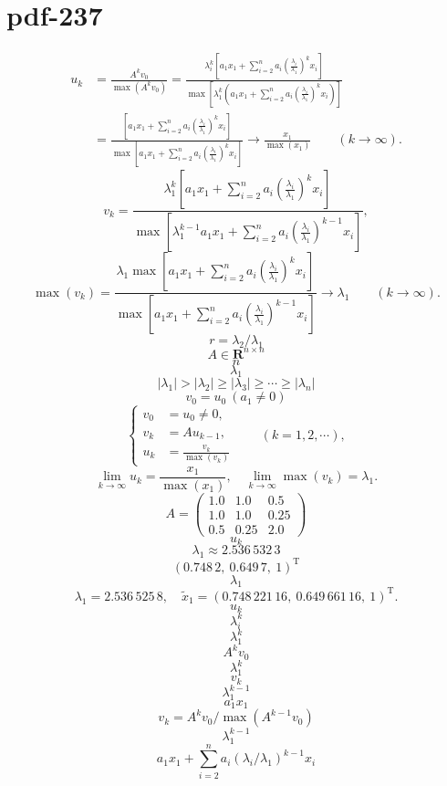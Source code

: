 \documentclass[fontset=fandol]{ctexart}
\begin{document}
\section*{pdf-237}
\[
\begin{aligned}
u_k&=\frac{A^kv_0}{\max(A^kv_0)}
=\frac{\lambda_i^k\left[a_1x_1+\displaystyle\sum_{i=2}^na_i\left(\frac{\lambda_i}{\lambda_1}\right)^kx_i\right]}{\max\left[\lambda_1^k\left(a_1x_1+\displaystyle\sum_{i=2}^na_i\left(\frac{\lambda_i}{\lambda_1}\right)^kx_i\right)\right]}\\
&=\frac{\left[a_1x_1+\displaystyle\sum_{i=2}^na_i\left(\frac{\lambda_i}{\lambda_1}\right)^kx_i\right]}{\max\left[a_1x_1+\displaystyle\sum_{i=2}^na_i\left(\frac{\lambda_i}{\lambda_1}\right)^kx_i\right]}
\to\frac{x_1}{\max(x_1)}\qquad(k\to\infty).
\end{aligned}
\]
\[
v_k=\frac{\lambda_1^k\left[a_1x_1+\displaystyle\sum_{i=2}^na_i\left(\frac{\lambda_i}{\lambda_1}\right)^kx_i\right]}{\max\left[\lambda_1^{k-1}a_1x_1+\displaystyle\sum_{i=2}^na_i\left(\frac{\lambda_i}{\lambda_1}\right)^{k-1}x_i\right]},
\]
\[
\max(v_k)=\frac{\lambda_1\max\left[a_1x_1+\displaystyle\sum_{i=2}^na_i\left(\frac{\lambda_i}{\lambda_1}\right)^kx_i\right]}{\max\left[a_1x_1+\displaystyle\sum_{i=2}^na_i\left(\frac{\lambda_i}{\lambda_1}\right)^{k-1}x_i\right]}\to\lambda_1\qquad(k\to\infty).
\]
\[
r=\lambda_2/\lambda_1
\]
\[
A\in\mathbf R^{n\times n}
\]
\[
n
\]
\[
\lambda_1
\]
\[
|\lambda_1|>|\lambda_2|\geq|\lambda_3|\geq\cdots\geq|\lambda_n|
\]
\[
v_0=u_0\ (a_1\ne0)
\]
\[
\left\{
\begin{aligned}
v_0&=u_0\ne0,\\
v_k&=Au_{k-1},\\
u_k&=\frac{v_k}{\max(v_k)}
\end{aligned}
\right.\qquad(k=1,2,\cdots),
\tag{9.2.9}
\]
\[
\lim_{k\to\infty}u_k=\frac{x_1}{\max(x_1)},\quad\lim_{k\to\infty}\max(v_k)=\lambda_1.
\]
\[
A=\begin{pmatrix}1.0&1.0&0.5\\1.0&1.0&0.25\\0.5&0.25&2.0\end{pmatrix}
\]
\[
u_k
\]
\[
\lambda_1\approx2.536\,532\,3
\]
\[
(0.748\,2,\ 0.649\,7,\ 1)^{\mathrm T}
\]
\[
\lambda_1
\]
\[
\lambda_1=2.536\,525\,8,\quad\widetilde{x}_1=(0.748\,221\,16,\ 0.649\,661\,16,\ 1)^{\mathrm T}.
\]
\[
u_k
\]
\[
\lambda_i^k
\]
\[
\lambda_1^k
\]
\[
A^kv_0
\]
\[
\lambda_1^k
\]
\[
v_k
\]
\[
\lambda_1^{k-1}
\]
\[
a_1x_1
\]
\[
v_k=A^kv_0/\max(A^{k-1}v_0)
\]
\[
\lambda_1^{k-1}
\]
\[
a_1x_1+\sum_{i=2}^na_i(\lambda_i/\lambda_1)^{k-1}x_i
\]
\end{document}
